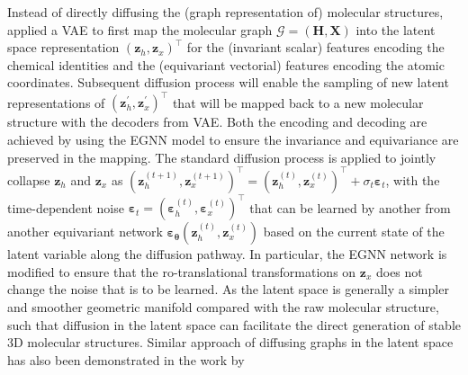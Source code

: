 Instead of directly diffusing the (graph representation of) molecular structures, \citet{xu2023geometric} applied a VAE to first map the molecular graph $\mathcal{G}=(\bm{H},\bm{X})$ into the latent space representation $(\bm{z}_{h},\bm{z}_x)^\top$ for the (invariant scalar) features encoding the chemical identities  and the (equivariant vectorial) features encoding the atomic coordinates.  Subsequent diffusion process will enable the sampling of new latent representations of $(\bm{z}_{h}^\prime,\bm{z}_x^\prime)^\top$ that will be mapped back to a new molecular structure with the decoders from VAE. Both the encoding and decoding are achieved by using the EGNN\cite{satorras2021n} model to ensure the invariance and equivariance are preserved in the mapping. The standard diffusion process is applied to jointly collapse $\bm{z}_{h}$ and $\bm{z}_x$ as $( \bm{z}_h^{(t+1)} , \bm{z}_x^{(t+1)})^\top=( \bm{z}_h^{(t)} , \bm{z}_x^{(t)})^\top+\sigma_t\boldsymbol{\varepsilon}_t$, with the time-dependent noise $\boldsymbol{\varepsilon}_t=(\boldsymbol{\varepsilon}_h^{(t)},\boldsymbol{\varepsilon}_x^{(t)})^\top$ that can be learned by another from another equivariant network $\boldsymbol{\varepsilon}_{\boldsymbol{\theta }}(\bm{z}_h^{(t)} , \bm{z}_x^{(t)})$ based on the current state of the latent variable along the diffusion pathway. In particular, the EGNN network is modified to ensure that the ro-translational transformations on  $\bm{z}_{x}$ does not change the noise that is to be learned. As the latent space is generally a simpler and smoother geometric manifold compared with the raw molecular structure, such that diffusion in the latent space can facilitate the direct generation of stable 3D molecular structures. Similar approach of diffusing graphs in the latent space has also been demonstrated in the work by \citet{you2024latent}


